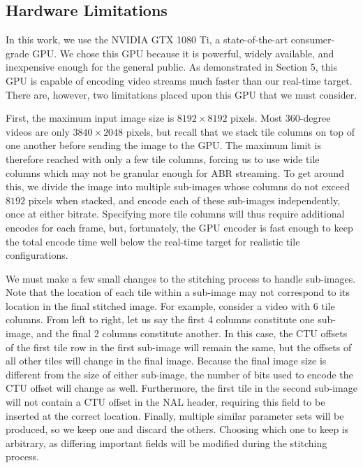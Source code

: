 \subsection{Hardware Limitations}

In this work, we use the NVIDIA GTX 1080 Ti, a state-of-the-art consumer-grade GPU. We chose this GPU because it is powerful, widely available, and inexpensive enough for the general public. As demonstrated in Section 5, this GPU is capable of encoding video streams much faster than our real-time target. There are, however, two limitations placed upon this GPU that we must consider.

First, the maximum input image size is $8192\times8192$ pixels. Most 360-degree videos are only $3840\times2048$ pixels, but recall that we stack tile columns on top of one another before sending the image to the GPU. The maximum limit is therefore reached with only a few tile columns, forcing us to use wide tile columns which may not be granular enough for ABR streaming. To get around this, we divide the image into multiple sub-images whose columns do not exceed $8192$ pixels when stacked, and encode each of these sub-images independently, once at either bitrate. Specifying more tile columns will thus require additional encodes for each frame, but, fortunately, the GPU encoder is fast enough to keep the total encode time well below the real-time target for realistic tile configurations. 

We must make a few small changes to the stitching process to handle sub-images. Note that the location of each tile within a sub-image may not correspond to its location in the final stitched image. For example, consider a video with 6 tile columns. From left to right, let us say the first 4 columns constitute one sub-image, and the final 2 columns constitute another. In this case, the CTU offsets of the first tile row in the first sub-image will remain the same, but the offsets of all other tiles will change in the final image. Because the final image size is different from the size of either sub-image, the number of bits used to encode the CTU offset will change as well. Furthermore, the first tile in the second sub-image will not contain a CTU offset in the NAL header, requiring this field to be inserted at the correct location. Finally, multiple similar parameter sets will be produced, so we keep one and discard the others. Choosing which one to keep is arbitrary, as differing important fields will be modified during the stitching process.

